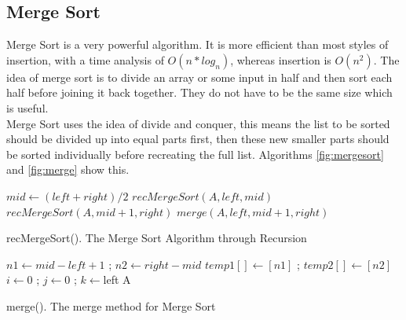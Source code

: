 \documentclass[10pt,twocolumn,hidelinks]{IEEEtran}
\begin{document}
\subsection{Merge Sort}
Merge Sort is a very powerful algorithm. It is more efficient than most styles of insertion, with a time analysis of $O(n * log_{n})$, whereas insertion is $O(n^2)$. The idea of merge sort is to divide an array or some input in half and then sort each half before joining it back together. They do not have to be the same size which is useful.  \\
Merge Sort uses the idea of divide and conquer, this means the list to be sorted should be divided up into equal parts first, then these new smaller parts should be sorted individually before recreating the full list. Algorithms \ref{fig:mergesort} and \ref{fig:merge} show this.
\IncMargin{1em}
\begin{algorithm}
	\LinesNumbered
  	{$mid \longleftarrow (left+right)/2$\;
  	$recMergeSort(A,left,mid)$\;
  	$recMergeSort(A,mid+1,right)$\;
  	$merge(A,left,mid+1,right)$
  	}
\caption{recMergeSort(). The Merge Sort Algorithm through Recursion}
\label{fig:mergesort}
\end{algorithm}\DecMargin{1em}

\IncMargin{1em}
\begin{algorithm}
	\LinesNumbered
 	$n1 \longleftarrow mid - left + 1$ ; $n2 \longleftarrow right - mid$\;
 	$temp1[] \longleftarrow [n1]$  ; $temp2[]\longleftarrow [n2]$\;
	$i \longleftarrow $0 ; $j \longleftarrow $0 ; $k \longleftarrow $left
	\Return A
\caption{merge(). The merge method for Merge Sort}
\label{fig:merge}
\end{algorithm}\DecMargin{1em}
\end{document}
